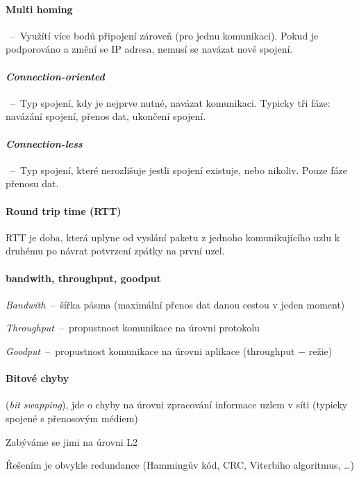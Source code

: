 \paragraph*{Multi homing}~--~Využítí více bodů připojení zároveň (pro jednu komunikaci). Pokud je podporováno a změní se IP adresa, nemusí se navázat nové spojení.

\paragraph*{\textit{Connection-oriented}}~--~Typ spojení, kdy je nejprve nutné, navázat komunikaci. Typicky tři fáze: navázání spojení, přenos dat, ukončení spojení.

\paragraph*{\textit{Connection-less}}~--~Typ spojení, které nerozlišuje jestli spojení existuje, nebo nikoliv. Pouze fáze přenosu dat.

\paragraph*{Round trip time (RTT)} RTT je doba, která uplyne od vyslání paketu z jednoho komunikujícího uzlu k druhému po návrat potvrzení zpátky na první uzel.

\paragraph*{bandwith, throughput, goodput} \begin{compactitem}
    \item \textit{Bandwith}~--~šířka pásma (maximální přenos dat danou cestou v jeden moment)
    \item \textit{Throughput}~--~propustnost komunikace na úrovni protokolu
    \item \textit{Goodput}~--~propustnost komunikace na úrovni aplikace (throughput $-$ režie)
\end{compactitem}

\paragraph*{Bitové chyby} \begin{compactitem}
    \item {} (\textit{bit swapping}), jde o chyby na úrovni zpracování informace uzlem v síti (typicky spojené s přenosovým médiem)
    \item Zabýváme se jimi na úrovni L2
    \item Řešením je obvykle redundance (Hammingův kód, CRC, Viterbiho algoritmus, \dots)
\end{compactitem}

